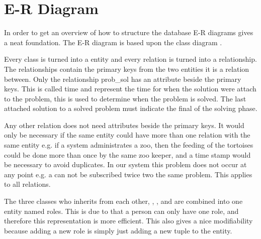 \newcommand{\erdiagram}[1][]{E-R diagram}
\section{E-R Diagram}
In order to get an overview of how to structure the database \erdiagram[]s gives a neat foundation. 
The \erdiagram[] is based upon the class diagram . 

Every class is turned into a entity and every relation is turned into a relationship. The relationships contain the primary keys from the two entities it is a relation between. Only the relationship prob\_sol has an attribute beside the primary keys. This is called time and represent the time for when the solution were attach to the problem, this is used to determine when the problem is solved. The last attached solution to a solved problem must indicate the final of the solving phase. 

Any other relation does not need attributes beside the primary keys. It would only be necessary if the same entity could have more than one relation with the same entity e.g. if a system administrates a zoo, then the feeding of the tortoises could be done more than once by the same zoo keeper, and a time stamp would be necessary to avoid duplicates. In our system this problem does not occur at any point e.g. a \client[] can not be subscribed twice two the same problem. This applies to all relations. 

The three classes who inherits from each other, \client[], \staff[], and \admin[] are combined into one entity named roles. This is due to that a person can only have one role, and therefore this representation is more efficient. This also gives a nice modifiability because adding a new role is simply just adding a new tuple to the entity. 